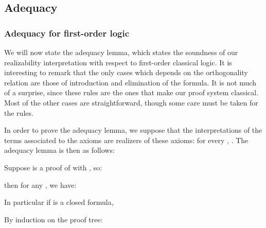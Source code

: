 \documentclass{CSML}
\begin{document}
\subsection{Adequacy}
\subsubsection{Adequacy for first-order logic}
We will now state the adequacy lemma, which states the soundness of our realizability interpretation with respect to first-order classical logic. It is interesting to remark that the only cases which depends on the orthogonality relation are those of introduction and elimination of the  formula. It is not much of a surprise, since these rules are the ones that make our proof system classical. Most of the other cases are straightforward, though some care must be taken for the  rules.\par
In order to prove the adequacy lemma, we suppose that the interpretations of the terms associated to the axioms are realizers of these axioms: for every , . The adequacy lemma is then as follows:
\begin{lem}
\label{adequacyLemma}
Suppose  is a proof of  with , so:

then for any , we have:

In particular if  is a closed formula, 
\end{lem}
\proof
By induction on the proof tree:
\end{document}
